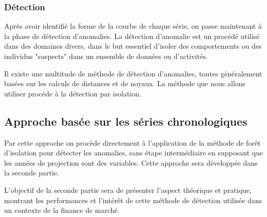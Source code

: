 \subsubsection{Détection}

Après avoir identifié la forme de la courbe de chaque série, on passe maintenant à la phase de détection d'anomalies. La détection d'anomalie est un procédé utilisé dans des domaines divers, dans le but essentiel d'isoler des comportements ou des individus "suspects" dans un ensemble de données ou d'activités.

Il existe une multitude de méthode de détection d'anomalies, toutes  généralement basées sur les calculs de distances et de noyaux. La méthode que nous allons utiliser procède à la détection par isolation.

\subsection{Approche basée sur les séries chronologiques}

Par cette approche on procède directement à l'application de la méthode de forêt d'isolation pour détecter les anomalies, sans étape intermédiaire en supposant que les années de projection sont des variables. Cette approche sera développée dans la seconde partie.

L'objectif de la seconde partie sera de présenter l'aspect théorique et pratique, montrant les performances et l'intérêt de cette méthode de détection utilisée dans un contexte de la finance de marché.


